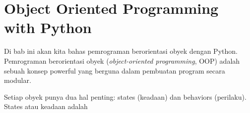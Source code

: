 \chapter{Object Oriented Programming with Python}

Di bab ini akan kita bahas pemrograman berorientasi obyek dengan Python. Pemrograman berorientasi obyek (\emph{object-oriented programming}, OOP) adalah sebuah konsep powerful yang berguna dalam pembuatan program secara modular.

Setiap obyek punya dua hal penting: states (keadaan) dan behaviors (perilaku). States atau keadaan adalah
